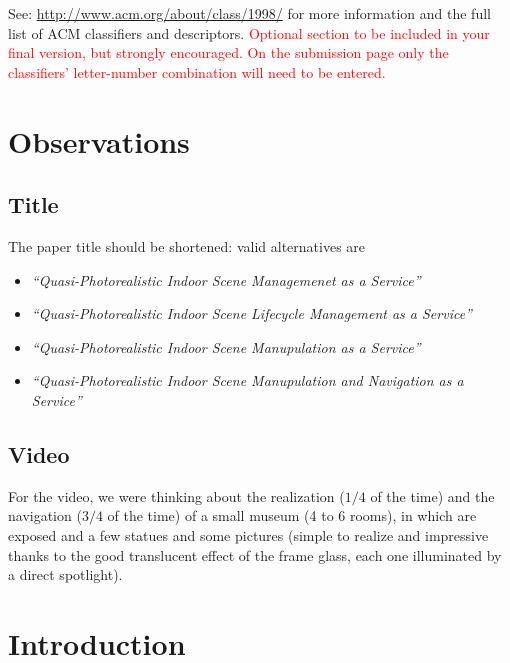 \documentclass{sigchi}
\begin{document}

See: \url{http://www.acm.org/about/class/1998/}
for more information and the full list of ACM classifiers
and descriptors. \newline
\textcolor{red}{Optional section to be included in your final version,
but strongly encouraged. On the submission page only the classifiers’
letter-number combination will need to be entered.}

\section{Observations}
\label{sec:Observations}

\subsection{Title} %
\label{sub:title}

The paper title should be shortened: valid alternatives are

\begin{itemize}
  \item \emph{``Quasi-Photorealistic Indoor Scene Managemenet as a Service''}
  \item \emph{``Quasi-Photorealistic Indoor Scene Lifecycle Management as a Service''}
  \item \emph{``Quasi-Photorealistic Indoor Scene Manupulation as a Service''}
  \item \emph{``Quasi-Photorealistic Indoor Scene Manupulation and Navigation as a Service''}
  \end{itemize}


\subsection{Video} %
\label{sub:video}

For the video, we were thinking about the realization ($1/4$ of the time) and the navigation ($3/4$ of the time) of a small museum (4 to 6 rooms), in which are exposed and a few statues and some pictures (simple to realize and impressive thanks to the good translucent effect of the frame glass, each one illuminated by a direct spotlight).



\section{Introduction}  %
\label{sec:introduction}
\end{document}
